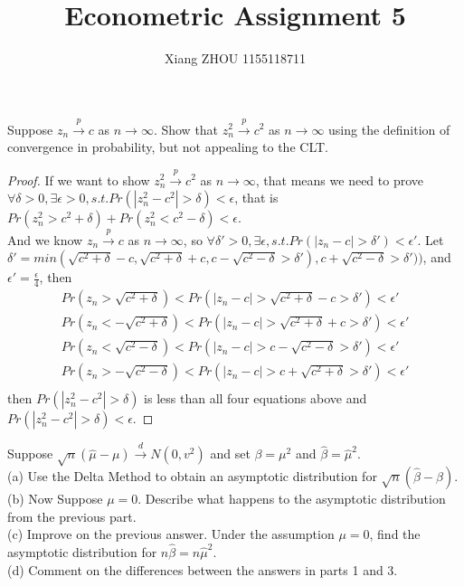 \documentclass[12pt]{article}
\newenvironment{question}[2][Question]{\begin{trivlist}
\item[\hskip \labelsep {\bmseries #1}\hskip \labelsep {\bmseries #2.}]}{\end{trivlist}}
\begin{document}
 
\title{Econometric Assignment 5}
\author{Xiang ZHOU 1155118711}
\maketitle
 
\begin{question}{6.10}
Suppose $z_n\xrightarrow{p}c$ as $n \to \infty$. Show that $z_n^2\xrightarrow{p}c^2$ as $n\to \infty$ using the definition of convergence in probability, but not appealing to the CLT.
\end{question}

\begin{proof}
If we want to show $z_n^2\xrightarrow{p}c^2$ as $n\to \infty$, that means we need to prove $\forall \delta>0, \exists \epsilon >0, s.t. Pr(|z_n^2-c^2|>\delta)<\epsilon$, that is 
$Pr(z_n^2>c^2+\delta) + Pr(z_n^2<c^2-\delta) < \epsilon$.\\
And we know $z_n\xrightarrow{p}c$ as $n \to \infty$, so $\forall \delta'>0, \exists \epsilon,s.t. Pr(|z_n-c|>\delta')<\epsilon'$. Let $\delta' = min(\sqrt{c^2+\delta}-c,\sqrt{c^2+\delta}+c,c-\sqrt{c^2-\delta}>\delta'),c+\sqrt{c^2-\delta}>\delta'))$, and $\epsilon' = \frac{\epsilon}{4}$, then 
\begin{align*}
Pr(z_n>\sqrt{c^2+\delta})<Pr(|z_n-c|>\sqrt{c^2+\delta}-c>\delta')<\epsilon'\\
Pr(z_n<-\sqrt{c^2+\delta})<Pr(|z_n-c|>\sqrt{c^2+\delta}+c>\delta')<\epsilon'\\
Pr(z_n<\sqrt{c^2-\delta})<Pr(|z_n-c|>c-\sqrt{c^2-\delta}>\delta')<\epsilon'\\
Pr(z_n>-\sqrt{c^2-\delta})<Pr(|z_n-c|>c+\sqrt{c^2+\delta}>\delta')<\epsilon'\\
\end{align*}
then $Pr(|z_n^2-c^2|>\delta)$ is less than all four equations above and $Pr(|z_n^2-c^2|>\delta)<\epsilon$.
\end{proof}

\begin{question}{6.13}
Suppose $\sqrt{n}(\hat{\mu}-\mu)\xrightarrow{d}N(0,v^2)$ and set $\beta = \mu^2$ and $\hat{\beta} = \hat{\mu}^2$.\\
(a) Use the Delta Method to obtain an asymptotic distribution for $\sqrt{n}(\hat{\beta}-\beta)$.\\
(b) Now Suppose $\mu = 0$. Describe what happens to the asymptotic distribution from the previous part.\\
(c) Improve on the previous answer. Under the assumption $\mu = 0$, find the asymptotic distribution for $n\hat{\beta} = n\hat{\mu}^2$.\\
(d) Comment on the differences between the answers in parts 1 and 3.
\end{question}
\end{document}
